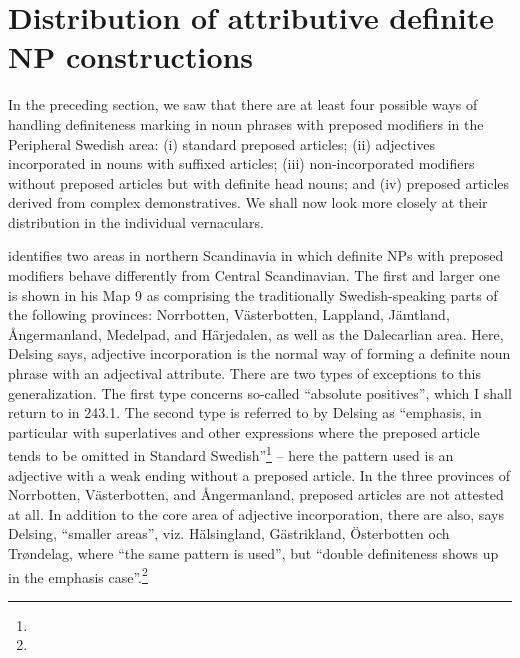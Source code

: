 \section{Distribution of attributive definite NP constructions}
\label{bkm:Ref141070030}
\begin{styleBodyTextFirst}
In the preceding section, we saw that there are at least four possible ways of handling definiteness marking in noun phrases with preposed modifiers in the Peripheral Swedish area: (i) standard preposed articles; (ii) adjectives incorporated in nouns with suffixed articles; (iii) non-incorporated modifiers without preposed articles but with definite head nouns; and (iv) preposed articles derived from complex demonstratives.  We shall now look more closely at their distribution in the individual vernaculars. 

\end{styleBodyTextFirst}

\begin{styleBodytextC}
\citet[49]{Delsing2003a} identifies two areas in northern Scandinavia in which definite NPs with preposed modifiers behave differently from Central Scandinavian. The first and larger one is shown in his Map 9 as comprising the traditionally Swedish-speaking parts of the following provinces: Norrbotten, Västerbotten, Lappland, Jämtland, Ångermanland, Medelpad, and Härjedalen, as well as the Dalecarlian area. Here, Delsing says, adjective incorporation is the normal way of forming a definite noun phrase with an adjectival attribute. There are two types of exceptions to this generalization. The first type concerns so-called “absolute positives”, which I shall return to in 243.1. The second type is referred to by Delsing as “emphasis, in particular with superlatives and other expressions where the preposed article tends to be omitted in Standard Swedish”\footnote{} – here the pattern used is an adjective with a weak ending without a preposed article. In the three provinces of Norrbotten, Västerbotten, and Ångermanland, preposed articles are not attested at all. In addition to the core area of adjective incorporation, there are also, says Delsing, “smaller areas”, viz. Hälsingland, Gästrikland, Österbotten och Trøndelag, where “the same pattern is used”, but “double definiteness shows up in the emphasis case”.\footnote{}

\end{styleBodytextC}


